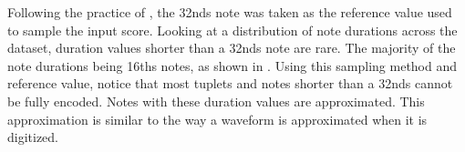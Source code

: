 
Following the practice of \textcite{micchi2020not}, the
\glspl{32nd} note was taken as the reference value used to
sample the input score. Looking at a distribution of note
durations across the dataset, duration values shorter than a
\glspl{32nd} note are rare. The majority of the note
durations being \glspl{16th} notes, as shown in
. Using this sampling method
and reference value, notice that most tuplets and notes
shorter than a \glspl{32nd} cannot be fully encoded. Notes
with these duration values are approximated. This
approximation is similar to the way a waveform is
approximated when it is digitized.

